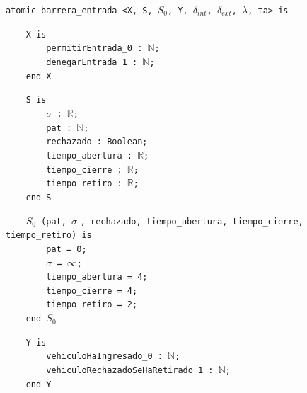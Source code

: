 \documentclass[12pt]{article}
\begin{document}
\begin{tcolorbox}[
    colback=black!5!white,
    colframe=black!80!white,
    boxrule=0.8pt,
    arc=2pt,
    left=5pt,
    right=5pt,
    top=5pt,
    bottom=5pt,
    fontupper=\ttfamily,
    breakable
]
\begin{flushleft}
\texttt{atomic barrera\_entrada <X, S, $S_0$, Y, }$\delta_{int}$\texttt{, }$\delta_{ext}$\texttt{, }$\lambda$\texttt{, ta> is}
\end{flushleft}

\begin{flushleft}
\texttt{~~~~X is} \\
\texttt{~~~~~~~~permitirEntrada\_0 : }\(\mathbb{N}\)\texttt{;} \\
\texttt{~~~~~~~~denegarEntrada\_1 : }\(\mathbb{N}\)\texttt{;} \\
\texttt{~~~~end X}
\end{flushleft}

\begin{flushleft}
\texttt{~~~~S is} \\
\texttt{~~~~~~~~}$\sigma$\texttt{ : }\(\mathbb{R}\)\texttt{;} \\
\texttt{~~~~~~~~pat : }\(\mathbb{N}\)\texttt{;} \\
\texttt{~~~~~~~~rechazado : Boolean;} \\
\texttt{~~~~~~~~tiempo\_abertura : }\(\mathbb{R}\)\texttt{;} \\
\texttt{~~~~~~~~tiempo\_cierre : }\(\mathbb{R}\)\texttt{;} \\
\texttt{~~~~~~~~tiempo\_retiro : }\(\mathbb{R}\)\texttt{;} \\
\texttt{~~~~end S}
\end{flushleft}

\begin{flushleft}
\texttt{~~~~$S_0$ (pat, }$\sigma$ \texttt{, rechazado, tiempo\_abertura, tiempo\_cierre, tiempo\_retiro) is} \\
\texttt{~~~~~~~~pat = 0;} \\
\texttt{~~~~~~~~}$\sigma$\texttt{ = }$\infty$\texttt{;} \\
\texttt{~~~~~~~~tiempo\_abertura = 4;} \\
\texttt{~~~~~~~~tiempo\_cierre = 4;} \\
\texttt{~~~~~~~~tiempo\_retiro = 2;} \\
\texttt{~~~~end }$S_0$
\end{flushleft}

\begin{flushleft}
\texttt{~~~~Y is} \\
\texttt{~~~~~~~~vehiculoHaIngresado\_0 : }\(\mathbb{N}\)\texttt{;} \\
\texttt{~~~~~~~~vehiculoRechazadoSeHaRetirado\_1 : }\(\mathbb{N}\)\texttt{;} \\
\texttt{~~~~end Y}
\end{flushleft}


\end{tcolorbox}
\end{document}
